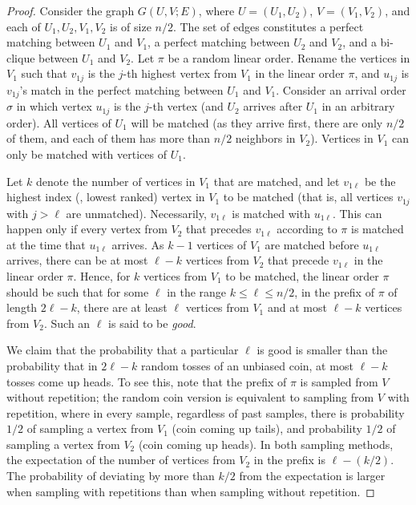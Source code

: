 \documentclass{toc}
\theoremstyle{plain}
\begin{document}
\begin{proof}
	Consider the graph $G(U,V;E)$, where $U=(U_1,U_2)$, $V=(V_1,V_2)$, and each of $U_1,U_2,V_1,V_2$ is of size $n/2$. The set of edges constitutes a perfect matching between $U_1$ and $V_1$, a perfect matching between $U_2$ and $V_2$, and a bi-clique between $U_1$ and $V_2$.
	Let $\pi$ be a random linear order. Rename the vertices in $V_1$ such that $v_{1j}$ is the $j$-th highest vertex from $V_1$ in the linear order $\pi$, and $u_{1j}$ is $v_{1j}$'s match in the perfect matching between $U_1$ and $V_1$.
	Consider an arrival order $\sigma$ in which vertex $u_{1j}$ is the $j$-th vertex (and $U_2$ arrives after $U_1$ in an arbitrary order). All vertices of $U_1$ will be matched (as they arrive first, there are only $n/2$ of them, and each of them has more than $n/2$ neighbors in $V_2$). Vertices in $V_1$ can only be matched with vertices of $U_1$. 
	
	Let $k$ denote the number of vertices in $V_1$ that are matched, and let $v_{1\ell}$ be the highest index (\ie, lowest ranked) vertex in $V_1$ to be matched (that is, all vertices $v_{1j}$ with $j>\ell$ are unmatched). Necessarily, $v_{1\ell}$ is matched with $u_{1\ell}$. This can happen only if every vertex from $V_2$ that precedes $v_{1\ell}$ according to $\pi$ is matched at the time that $u_{1\ell}$ arrives. As $k-1$ vertices of $V_1$ are matched before $u_{1\ell}$ arrives, there can be at most $\ell - k$ vertices from $V_2$ that precede $v_{1\ell}$ in the linear order $\pi$. Hence, for $k$ vertices from $V_1$ to be matched, the linear order $\pi$ should be such that for some $\ell$ in the range $k \le \ell \le n/2$, in the prefix of $\pi$ of length $2\ell-k$, there are at least $\ell$ vertices from $V_1$ and at most $\ell - k$ vertices from $V_2$. Such an $\ell$ is said to be \emph{good}. 
	
	We claim that the probability that a particular $\ell$ is good is smaller than the probability that in $2\ell-k$ random tosses of an unbiased coin, at most $\ell-k$ tosses come up heads. To see this, note that the prefix of $\pi$ is sampled from $V$ without repetition; the random coin version is equivalent to sampling from $V$ with repetition, where in every sample, regardless of past samples, there is probability %
 $1/2$   %
of sampling a vertex from $V_1$ (coin coming up tails), and probability
%
$1/2$   %
of sampling a vertex from $V_2$ (coin coming up heads). In both sampling methods, the expectation of the number of vertices from $V_2$ in the prefix is 
%
$\ell - (k/2)$.   %
 The probability of deviating by more than 
%
$k/2$  %
from the expectation is larger when sampling with repetitions than when sampling without repetition. 
	

\end{proof}
\end{document}
